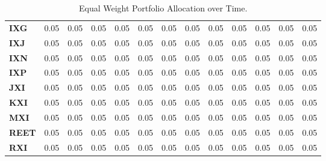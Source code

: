 \begin{table}[h!]
{\begin{tabular}{lrrrrrrrrrrrr}
        \textbf{IXG} & 0.05 & 0.05 & 0.05 & 0.05 & 0.05 & 0.05 & 0.05 & 0.05 & 0.05 & 0.05 & 0.05 & 0.05 \\
        \textbf{IXJ} & 0.05 & 0.05 & 0.05 & 0.05 & 0.05 & 0.05 & 0.05 & 0.05 & 0.05 & 0.05 & 0.05 & 0.05 \\
        \textbf{IXN} & 0.05 & 0.05 & 0.05 & 0.05 & 0.05 & 0.05 & 0.05 & 0.05 & 0.05 & 0.05 & 0.05 & 0.05 \\
        \textbf{IXP} & 0.05 & 0.05 & 0.05 & 0.05 & 0.05 & 0.05 & 0.05 & 0.05 & 0.05 & 0.05 & 0.05 & 0.05 \\
        \textbf{JXI} & 0.05 & 0.05 & 0.05 & 0.05 & 0.05 & 0.05 & 0.05 & 0.05 & 0.05 & 0.05 & 0.05 & 0.05 \\
        \textbf{KXI} & 0.05 & 0.05 & 0.05 & 0.05 & 0.05 & 0.05 & 0.05 & 0.05 & 0.05 & 0.05 & 0.05 & 0.05 \\
        \textbf{MXI} & 0.05 & 0.05 & 0.05 & 0.05 & 0.05 & 0.05 & 0.05 & 0.05 & 0.05 & 0.05 & 0.05 & 0.05 \\
        \textbf{REET} & 0.05 & 0.05 & 0.05 & 0.05 & 0.05 & 0.05 & 0.05 & 0.05 & 0.05 & 0.05 & 0.05 & 0.05 \\
        \textbf{RXI} & 0.05 & 0.05 & 0.05 & 0.05 & 0.05 & 0.05 & 0.05 & 0.05 & 0.05 & 0.05 & 0.05 & 0.05
    \end{tabular}}
    \caption{Equal Weight Portfolio Allocation over Time.}
\end{table}